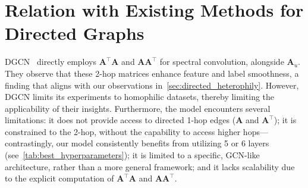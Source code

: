 \documentclass{article}
\theoremstyle{plain}
\theoremstyle{definition}
\theoremstyle{remark}
\begin{document}
\section{Relation with Existing Methods for Directed Graphs} \label{sec:comparison_with_directed_graph_methods}
DGCN~\cite{dgcn} directly employs $\mathbf{A}^\top\mathbf{A}$ and $\mathbf{A}\mathbf{A}^\top$ for spectral convolution, alongside $\mathbf{A}_u$. They observe that these 2-hop matrices enhance feature and label smoothness, a finding that aligns with our observations in~\cref{sec:directed_heterophily}. However, DGCN limits its experiments to homophilic datasets, thereby limiting the applicability of their insights. Furthermore, the model encounters several limitations: it does not provide access to directed 1-hop edges ($\mathbf{A}$ and $\mathbf{A}^\top$); it is constrained to the 2-hop, without the capability to access higher hops—contrastingly, our model consistently benefits from utilizing 5 or 6 layers (see~\cref{tab:best_hyperparameters}); it is limited to a specific, GCN-like architecture, rather than a more general framework; and it lacks scalability due to the explicit computation of $\mathbf{A}^\top\mathbf{A}$ and $\mathbf{A}\mathbf{A}^\top$.
\end{document}
